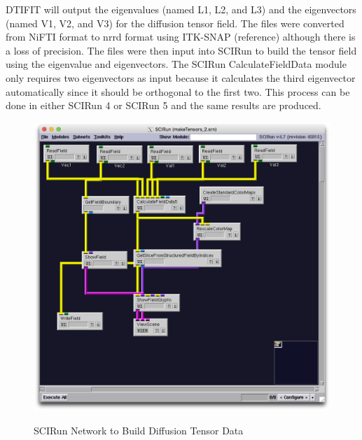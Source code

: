 DTIFIT will output the eigenvalues (named L1, L2, and L3) and the eigenvectors (named V1, V2, and V3) for the diffusion tensor field. The files were converted from NiFTI format to nrrd format using ITK-SNAP (reference) although there is a loss of precision. The files were then input into SCIRun to build the tensor field using the eigenvalue and eigenvectors. The SCIRun CalculateFieldData module only requires two eigenvectors as input because it calculates the third eigenvector automatically since it should be orthogonal to the first two. This process can be done in either SCIRun 4 or SCIRun 5 and the same results are produced. 

\begin{figure}[p]
\begin{center}
\includegraphics[width=\textwidth]{Figures/make_DTI.png}\\
\caption{SCIRun Network to Build Diffusion Tensor Data}
\label{fig:maketensornet}
\end{center}
\end{figure}

